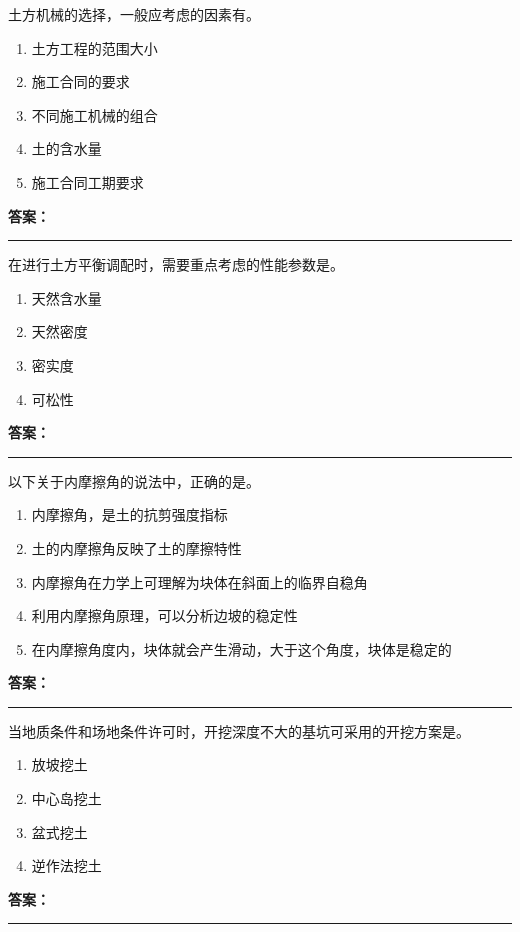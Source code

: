 \documentclass[UTF8,fontset=fandol,11pt]{ctexart}
\newcommand{\answerline}{\textcolor{answerred}{\rule{2.4cm}{0.7pt}}}
\begin{document}
\begin{quizbox}[title={第 7 题}]
土方机械的选择，一般应考虑的因素有。\\
\begin{enumerate}[label=\Alph*.]
\item 土方工程的范围大小
\item 施工合同的要求
\item 不同施工机械的组合
\item 土的含水量
\item 施工合同工期要求
\end{enumerate}
\textbf{\textcolor{answerred}{答案：}} \answerline
\end{quizbox}

\begin{quizbox}[title={第 8 题}]
在进行土方平衡调配时，需要重点考虑的性能参数是。\\
\begin{enumerate}[label=\Alph*.]
\item 天然含水量
\item 天然密度
\item 密实度
\item 可松性
\end{enumerate}
\textbf{\textcolor{answerred}{答案：}} \answerline
\end{quizbox}

\begin{quizbox}[title={第 9 题}]
以下关于内摩擦角的说法中，正确的是。\\
\begin{enumerate}[label=\Alph*.]
\item 内摩擦角，是土的抗剪强度指标
\item 土的内摩擦角反映了土的摩擦特性
\item 内摩擦角在力学上可理解为块体在斜面上的临界自稳角
\item 利用内摩擦角原理，可以分析边坡的稳定性
\item 在内摩擦角度内，块体就会产生滑动，大于这个角度，块体是稳定的
\end{enumerate}
\textbf{\textcolor{answerred}{答案：}} \answerline
\end{quizbox}

\begin{quizbox}[title={第 10 题}]
当地质条件和场地条件许可时，开挖深度不大的基坑可采用的开挖方案是。\\
\begin{enumerate}[label=\Alph*.]
\item 放坡挖土
\item 中心岛挖土
\item 盆式挖土
\item 逆作法挖土
\end{enumerate}
\textbf{\textcolor{answerred}{答案：}} \answerline
\end{quizbox}
\end{document}
